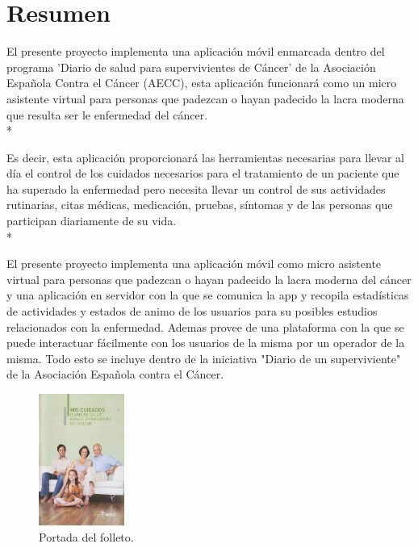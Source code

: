 \documentclass[b5paper,10pt,twoside]{book}
\begin{document}
	

	\chapter*{Resumen}
		El presente proyecto implementa una aplicación móvil enmarcada dentro del programa 'Diario de salud para supervivientes de Cáncer' de la Asociación Española Contra el Cáncer (AECC), esta aplicación funcionará como un micro asistente virtual para personas que padezcan o hayan padecido la lacra moderna que resulta ser le enfermedad del cáncer.\\*
		
		Es decir, esta aplicación proporcionará las herramientas necesarias para llevar al día el control de los cuidados necesarios para el tratamiento de un paciente que ha superado la enfermedad pero necesita llevar un control de sus actividades rutinarias, citas médicas, medicación, pruebas, síntomas y de las personas que participan diariamente de su vida.\\*
		
		El presente proyecto implementa una aplicación móvil como micro asistente virtual para personas que padezcan o hayan padecido la lacra moderna del cáncer y una aplicación en servidor con la que se comunica la app y recopila estadísticas de actividades y estados de animo de los usuarios para su posibles estudios relacionados con la enfermedad. Ademas provee de una plataforma con la que se puede interactuar fácilmente con los usuarios de la misma por un operador de la misma. Todo esto se incluye dentro de la iniciativa "Diario de un superviviente" de la Asociación Española contra el Cáncer.\\
	 	
	\begin{figure}[h]
		\centering
		\includegraphics[width=0.25\textwidth]{fotointro}
		\caption{Portada del folleto.}
		\label{fig:mesh1}
	\end{figure}
	 
\end{document}
